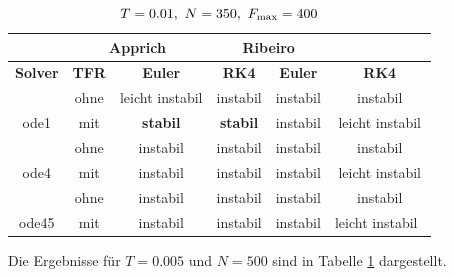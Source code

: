 \begin{table}[htbp]
	\centering
		\begin{tabular}{c|c|c|c|c|c}
			\rowcolor[gray]{0.9}
			\multicolumn{2}{c|}{\textbf{Simulation}} & \multicolumn{2}{c|}{\textbf{Apprich}} & \multicolumn{2}{c}{\textbf{Ribeiro}} \\
			\midrule
			\rowcolor[gray]{0.9}
			\textbf{Solver} & \textbf{TFR} & \textbf{Euler} & \textbf{RK4} & \textbf{Euler} & \textbf{RK4} \\
			\midrule
			\cellcolor[gray]{0.9}  											& \cellcolor[gray]{.9}ohne & leicht instabil & instabil       & instabil & instabil\\
			\multirow{-2}{*}{\cellcolor[gray]{.9}ode1}	& \cellcolor[gray]{.9}mit  & \textbf{stabil} & \textbf{stabil} & instabil & leicht instabil\\
			\midrule
			\cellcolor[gray]{0.9}  											& \cellcolor[gray]{.9}ohne    & instabil	&  instabil & instabil & instabil\\
			\multirow{-2}{*}{\cellcolor[gray]{.9}ode4}	& \cellcolor[gray]{.9}mit     & instabil  & instabil  & instabil & leicht instabil\\
			\midrule	
			\cellcolor[gray]{0.9}  											& \cellcolor[gray]{.9}ohne    & instabil &  instabil    & instabil 	& instabil\\
			\multirow{-2}{*}{\cellcolor[gray]{.9}ode45}	& \cellcolor[gray]{.9}mit     & instabil &  instabil    & instabil 	& leicht instabil\																											
		\end{tabular}
	\caption{$T=0.01, \ N=350, \ F_{\mrm{max}}=400$}
	\label{tab:T001N350Fmax400}
\end{table}

Die Ergebnisse für $T=0.005$ und $N=500$ sind in Tabelle \ref{tab:T001N350Fmax400} dargestellt.

